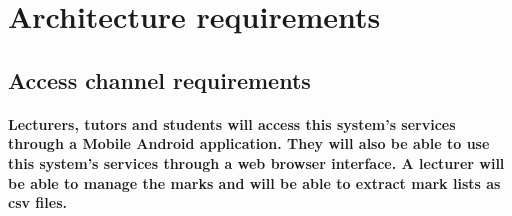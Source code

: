 \documentclass[12pt]{article}
\begin{document}
  \section{Architecture requirements}
  \subsection{Access channel requirements}
  \paragraph*{Lecturers, tutors and students will access this system's services through a Mobile Android application. They will also be able to use this system's services through a web browser interface. A lecturer will be able to manage the marks and will be able to extract mark lists as csv files.}
\end{document}
